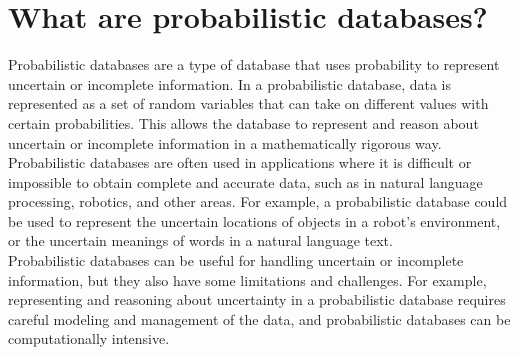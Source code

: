 \chapter{What are probabilistic databases?}
Probabilistic databases are a type of database that uses probability to represent uncertain or incomplete information. In a probabilistic database, data is represented as a set of random variables that can take on different values with certain probabilities. This allows the database to represent and reason about uncertain or incomplete information in a mathematically rigorous way. \\

Probabilistic databases are often used in applications where it is difficult or impossible to obtain complete and accurate data, such as in natural language processing, robotics, and other areas. For example, a probabilistic database could be used to represent the uncertain locations of objects in a robot's environment, or the uncertain meanings of words in a natural language text. \\

Probabilistic databases can be useful for handling uncertain or incomplete information, but they also have some limitations and challenges. For example, representing and reasoning about uncertainty in a probabilistic database requires careful modeling and management of the data, and probabilistic databases can be computationally intensive.